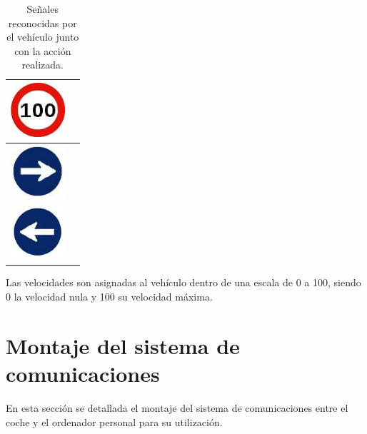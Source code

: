 \begin{table}[H]
  \begin{center}
    \begin{tabular}{|p{2cm}|p{8cm}|}
      \hline \includegraphics[width=2cm]{../imagenes/10.jpg} & \vspace*{-.8in}{Velocidad fijada a 100*.} \\
      \hline \includegraphics[width=2cm]{../imagenes/11.jpg} & \vspace*{-.8in}{Efectúa un giro cerrado a la derecha.} \\
      \hline \includegraphics[width=2cm]{../imagenes/12.jpg} & \vspace*{-.8in}{Efectúa un giro cerrado a la izquierda.} \\
      \hline
    \end{tabular}
  \end{center}
  \caption{Señales reconocidas por el vehículo junto con la acción realizada.}
\end{table}

\begin{fondo}
  \begin{nota}
    Las velocidades son asignadas al vehículo dentro de una escala de 0 a 100, siendo 0 la velocidad nula y 100 su velocidad máxima.
  \end{nota}
\end{fondo}

\section{Montaje del sistema de comunicaciones}
\label{sec:montaje-sistema-comunicaciones}

En esta sección se detallada el montaje del sistema de comunicaciones entre el coche y el ordenador personal para su utilización.\\

